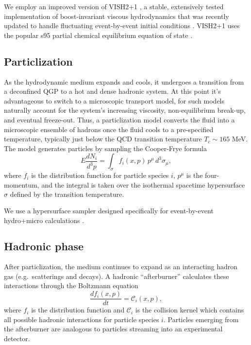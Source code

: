 \documentclass[aps,prc,reprint,superscriptaddress,amsmath]{revtex4-1}
\begin{document}
We employ an improved version of VISH2+1 \cite{Song:2007ux}, a stable, extensively tested implementation of boost-invariant viscous hydrodynamics that was recently updated to handle fluctuating event-by-event initial conditions \cite{Shen:2014vra}.
VISH2+1 uses the popular s95 partial chemical equilibrium equation of state \cite{Huovinen:2009yb}.

\subsection{Particlization}

As the hydrodynamic medium expands and cools, it undergoes a transition from a deconfined QGP to a hot and dense hadronic system.
At this point it's advantageous to switch to a microscopic transport model, for such models naturally account for the system's increasing viscosity, non-equilibrium break-up, and eventual freeze-out.
Thus, a particlization model converts the fluid into a microscopic ensemble of hadrons once the fluid cools to a pre-specified temperature, typically just below the QCD transition temperature $T_c \sim 165$ MeV.
The model generates particles by sampling the Cooper-Frye formula \cite{Cooper:1974mv}
\begin{equation}
  E \frac{dN_i}{d^3p} = \int_\sigma f_i(x,p) \, p^\mu \, d^3\sigma_\mu,
\end{equation}
where $f_i$ is the distribution function for particle species $i$, $p^\mu$ is the four-momentum, and the integral is taken over the isothermal spacetime hypersurface $\sigma$ defined by the transition temperature.

We use a hypersurface sampler designed specifically for event-by-event hydro+micro calculations \cite{Qiu:2013wca,Shen:2014vra}.

\subsection{Hadronic phase}

After particlization, the medium continues to expand as an interacting hadron gas (e.g.\ scatterings and decays).
A hadronic ``afterburner'' calculates these interactions through the Boltzmann equation
\begin{equation}
  \frac{df_i(x,p)}{dt} = \mathcal C_i(x,p),
\end{equation}
where $f_i$ is the distribution function and $\mathcal C_i$ is the collision kernel which contains all possible hadronic interactions for particle species $i$.
Particles emerging from the afterburner are analogous to particles streaming into an experimental detector.
\end{document}
